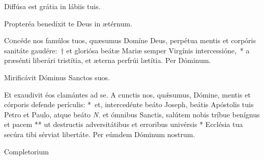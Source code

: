 \documentclass[vesperale_romanum.tex]{subfiles}
\begin{document}
\altertonus


\vv Diffúsa est grátia in lábiis tuis.

\rr Propteréa benedíxit te Deus in ætérnum.

\label{an_beata_mater_in_sabbato_solesmes_1961}


\oratio \label{oratio_bmv}

\lettrine{C}{o}ncéde nos famúlos tuos, quæsumus Domíne Deus, perpétua mentis et corpóris sanitáte gaudére:~† et gloriósa beátæ Mariæ semper Virgínis intercessióne,~* a præsénti liberári tristítia, et æterna perfrúi lætítia. Per Dóminum.





\vv Mirificávit Dóminus Sanctos suos.

\rr Et exaudivit éos clamántes ad se.
%
\oratio
%
\lettrine{A}{} cun\-ctis nos, quǽsumus, Dómine, mentis et córporis defende perículis: \nolinebreak[4]*~et, intercedénte beáto Joseph, beátis Apóstolis tuis Petro et Paulo, atque beáto \textit{N.} et ómnibus Sanctis, salútem nobis tríbue benígnus et pacem ** ut destructis adversitátibus et erroribus univérsis * Ecclésia tua secúra tibi sérviat libertáte. Per eúmdem Dóminum nostrum.



Completorium  %

\end{document}
